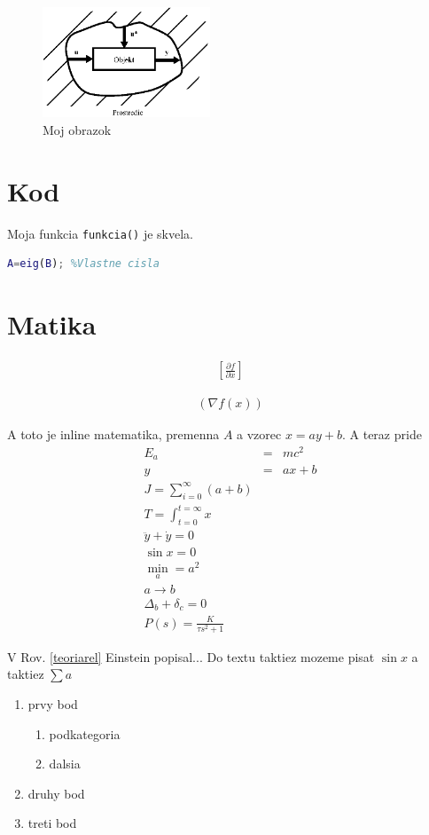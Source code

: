 \documentclass{book}
\begin{document}
\tableofcontents

\begin{figure}
\centering
  \includegraphics[width=5cm]{OBRAZOK1_1}
  \caption{Moj obrazok}
  \label{odkaznaobrazok}
\end{figure}

\chapter{Kod}

Moja funkcia \lstinline{funkcia()} je skvela.

\begin{lstlisting}[language=Matlab]
A=eig(B); %Vlastne cisla
\end{lstlisting}








\chapter{Matika}

\begin{eqnarray}
\left[\frac{\partial f}{\partial x}\right]
\end{eqnarray}

\begin{eqnarray}
(\nabla f(x))
\end{eqnarray}

A toto je inline matematika, premenna $A$ a vzorec $x=ay+b$. A teraz pride
\begin{eqnarray}
\label{teoriarel}
E_a&=&mc^2\\
\nonumber
y&=&ax+b\\
J=\sum_{i=0}^{\infty}(a+b)\\
T=\int_{t=0}^{t=\infty}x\\
\ddot{y}+\dot{y}=0\\
\sin x = 0\\
\min_a = a^2\\
a\rightarrow b\\
\Delta_b+\delta_c=0\\
P(s)=\frac{K}{\tau s^2+1}
\end{eqnarray}

V Rov. \eqref{teoriarel} Einstein popisal... Do textu taktiez mozeme pisat $\sin x$ a taktiez $\sum a$

\begin{enumerate}
\item prvy bod
\begin{enumerate}
\item podkategoria
\item dalsia
\end{enumerate}
\item druhy bod
\item treti bod
\end{enumerate}



\end{document}
